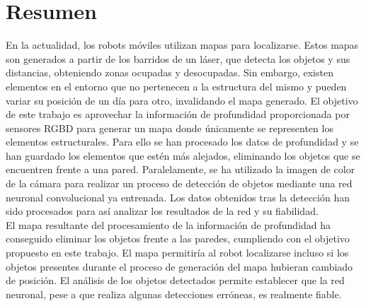 

\usepackage[
backend=biber,
style=numeric,
sorting=none,
dateabbrev=false,
citestyle=numeric
]{biblatex}




\usepackage[font=footnotesize, skip=4pt, justification=centering]{caption}

\raggedbottom

\usepackage{array}

\newcommand{\comment}[1]{}




\pagestyle{fancy}

\maketitle

\chapter*{Resumen}
\setcounter{page}{5} %

En la actualidad, los robots móviles utilizan mapas para localizarse. Estos mapas son generados a partir de los barridos de un láser, que detecta los objetos y sus distancias, obteniendo zonas ocupadas y desocupadas. Sin embargo, existen elementos en el entorno que no pertenecen a la estructura del mismo y pueden variar su posición de un día para otro, invalidando el mapa generado. El objetivo de este trabajo es aprovechar la información de profundidad proporcionada por sensores RGBD para generar un mapa donde únicamente se representen los elementos estructurales. Para ello se han procesado los datos de profundidad y se han guardado los elementos que estén más alejados, eliminando los objetos que se encuentren frente a una pared. Paralelamente, se ha utilizado la imagen de color de la cámara para realizar un proceso de detección de objetos mediante una red neuronal convolucional ya entrenada. Los datos obtenidos tras la detección han sido procesados para así analizar los resultados de la red y su fiabilidad.\\

El mapa resultante del procesamiento de la información de profundidad ha conseguido eliminar los objetos frente a las paredes, cumpliendo con el objetivo propuesto en este trabajo. El mapa permitiría al robot localizarse incluso si los objetos presentes durante el proceso de generación del mapa hubieran cambiado de posición. El análisis de los objetos detectados permite establecer que la red neuronal, pese a que realiza algunas detecciones erróneas, es realmente fiable.\\



